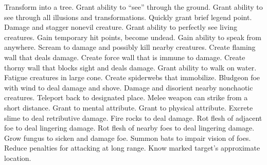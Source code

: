    {Transform into a tree.}
    {Grant ability to ``see'' through the ground.}
    {Grant ability to see through all illusions and transformations.}
    {Quickly grant brief legend point.}
    {Damage and stagger nonevil creature.}
    {Grant ability to perfectly see living creatures.}
    {Gain temporary hit points, become undead.}
    {Gain ability to speak from anywhere.}
    {Scream to damage and possibly kill nearby creatures.}
    {Create flaming wall that deals damage.}
    {Create force wall that is immune to damage.}
    {Create thorny wall that blocks sight and deals damage.}
    {Grant ability to walk on water.}
    {Fatigue creatures in large cone.}
    {Create spiderwebs that immobilize.}
    {Bludgeon foe with wind to deal damage and shove.}
    {Damage and disorient nearby nonchaotic creatures.}
    {Teleport back to designated place.}
    {Melee weapon can strike from a short distance.}
    {Grant  to mental attribute.}
    {Grant  to physical attribute.}
    {Excrete slime to deal retributive damage.}
    {Fire rocks to deal damage.}
    {Rot flesh of adjacent foe to deal lingering damage.}
    {Rot flesh of nearby foes to deal lingering damage.}
    {Grow fungus to sicken and damage foe.}
    {Summon bats to impair vision of foes.}
    {Reduce penalties for attacking at long range.}
    {Know marked target's approximate location.}
